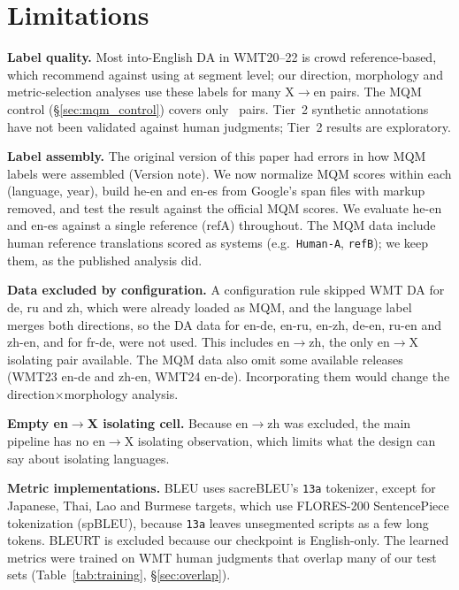 \documentclass[11pt]{article}
\begin{document}
\section*{Limitations}
\label{sec:limitations}

\textbf{Label quality.} Most into-English DA in WMT20--22 is crowd reference-based, which \citet{freitag2022results} recommend against using at segment level; our direction, morphology and metric-selection analyses use these labels for many X$\to$en pairs. The MQM control (\S\ref{sec:mqm_control}) covers only \MqmCtrlNPairs\ pairs. Tier~2 synthetic annotations have not been validated against human judgments; Tier~2 results are exploratory.

\textbf{Label assembly.} The original version of this paper had errors in how MQM labels were assembled (Version note). We now normalize MQM scores within each (language, year), build he-en and en-es from Google's span files with markup removed, and test the result against the official MQM scores. We evaluate he-en and en-es against a single reference (refA) throughout. The MQM data include human reference translations scored as systems (e.g.\ \texttt{Human-A}, \texttt{refB}); we keep them, as the published analysis did.

\textbf{Data excluded by configuration.} A configuration rule skipped WMT DA for de, ru and zh, which were already loaded as MQM, and the language label merges both directions, so the DA data for en-de, en-ru, en-zh, de-en, ru-en and zh-en, and for fr-de, were not used. This includes en$\to$zh, the only en$\to$X isolating pair available. The MQM data also omit some available releases (WMT23 en-de and zh-en, WMT24 en-de). Incorporating them would change the direction$\times$morphology analysis.

\textbf{Empty en$\to$X isolating cell.} Because en$\to$zh was excluded, the main pipeline has no en$\to$X isolating observation, which limits what the design can say about isolating languages.

\textbf{Metric implementations.} BLEU uses sacreBLEU's \texttt{13a} tokenizer, except for Japanese, Thai, Lao and Burmese targets, which use FLORES-200 SentencePiece tokenization (spBLEU), because \texttt{13a} leaves unsegmented scripts as a few long tokens. BLEURT is excluded because our checkpoint is English-only. The learned metrics were trained on WMT human judgments that overlap many of our test sets (Table~\ref{tab:training}, \S\ref{sec:overlap}).
\end{document}
